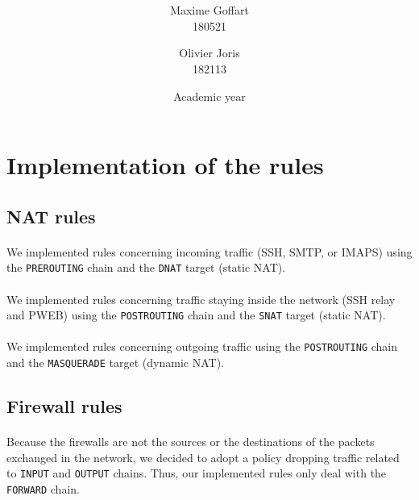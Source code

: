 \documentclass[a4paper, 11pt, oneside]{article}
\title{\ClassName\\\vspace*{0.8cm}\ProjectName\vspace{1cm}}
\author{Maxime Goffart \\180521 \and Olivier Joris\\182113}
\date{\vspace{1cm}Academic year \AcademicYear}
\begin{document}

\begin{titlingpage}
{\let\newpage\relax\maketitle}
\end{titlingpage}

\newpage


\section{Implementation of the rules}

\subsection{NAT rules}

\paragraph{}We implemented rules concerning incoming traffic (SSH, SMTP, or IMAPS) using the \texttt{PREROUTING} chain and the \texttt{DNAT} target (static NAT).

\paragraph{}We implemented rules concerning traffic staying inside the network (SSH relay and PWEB) using the \texttt{POSTROUTING} chain and the \texttt{SNAT} target (static NAT).

\paragraph{}We implemented rules concerning outgoing traffic using the \texttt{POSTROUTING} chain and the \texttt{MASQUERADE} target (dynamic NAT).

\subsection{Firewall rules}

\paragraph{}Because the firewalls are not the sources or the destinations of the packets exchanged in the network, we decided to adopt a policy dropping traffic related to \texttt{INPUT} and \texttt{OUTPUT} chains. Thus, our implemented rules only deal with the \texttt{FORWARD} chain.
\end{document}
